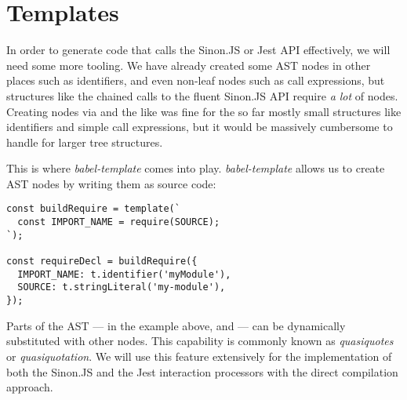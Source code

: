 \section{Templates}
In order to generate code that
calls the Sinon.JS or Jest API effectively,
we will need some more tooling.
We have already created some AST nodes in other places such as identifiers,
and even non-leaf nodes such as call expressions,
but structures like the chained calls to the fluent Sinon.JS API
require \textit{a lot} of nodes.
Creating nodes via  and the like was fine
for the so far mostly small structures like
identifiers and simple call expressions,
but it would be massively cumbersome to handle
for larger tree structures.

This is where \textit{babel-template} comes into play.
\textit{babel-template} allows us to create AST nodes
by writing them as source code:
\autocite{BabelTemplateDoc}
\begin{verbatim}
const buildRequire = template(`
  const IMPORT_NAME = require(SOURCE);
`);

const requireDecl = buildRequire({
  IMPORT_NAME: t.identifier('myModule'),
  SOURCE: t.stringLiteral('my-module'),
});
\end{verbatim}
Parts of the AST
--- in the example above,  and  ---
can be dynamically substituted with other nodes.
This capability is commonly known as
\textit{quasiquotes} or \textit{quasiquotation}.
\autocite{LispQuasiquotation}
We will use this feature extensively for the implementation
of both the Sinon.JS and the Jest interaction processors
with the direct compilation approach.
